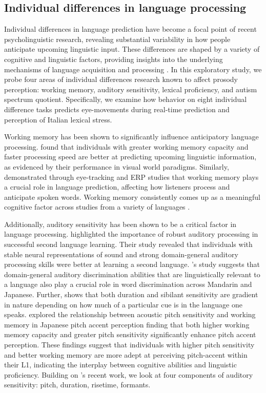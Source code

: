 \subsection{Individual differences in language processing}

Individual differences in language prediction have become a focal point of recent psycholinguistic research, revealing substantial variability in how people anticipate upcoming linguistic input. These differences are shaped by a variety of cognitive and linguistic factors, providing insights into the underlying mechanisms of language acquisition and processing \citep{Huettig2016,Li2023,Kidd2018}. In this exploratory study, we probe four areas of individual differences research known to affect prosody perception: working memory, auditory sensitivity, lexical proficiency, and autism spectrum quotient. Specifically, we examine how behavior on eight individual difference tasks predicts eye-movements during real-time prediction and perception of Italian lexical stress.

Working memory has been shown to significantly influence anticipatory language processing. \cite{Huettig2016} found that individuals with greater working memory capacity and faster processing speed are better at predicting upcoming linguistic information, as evidenced by their performance in visual world paradigms. Similarly, \cite{Li2023} demonstrated through eye-tracking and ERP studies that working memory plays a crucial role in language prediction, affecting how listeners process and anticipate spoken words. Working memory consistently comes up as a meaningful cognitive factor across studies from a variety of languages \citep{mchaney_et_al_2021_workingmemory,goss_2014,hadar_2016}. 

Additionally, auditory sensitivity has been shown to be a critical factor in language processing. \cite{Kachlicka_Saito_Tierney_2019} highlighted the importance of robust auditory processing in successful second language learning. Their study revealed that individuals with stable neural representations of sound and strong domain-general auditory processing skills were better at learning a second language. \cite{bramlett_wiener_24_speechprosody}'s study suggests that domain-general auditory discrimination abilities that are linguistically relevant to a language also play a crucial role in word discrimination across Mandarin and Japanese. Further, \cite{Pajak_2014} shows that both duration and sibilant sensitivity are gradient in nature depending on how much of a particular cue is in the language one speaks. \cite{goss_2014} explored the relationship between acoustic pitch sensitivity and working memory in Japanese pitch accent perception finding that both higher working memory capacity and greater pitch sensitivity significantly enhance pitch accent perception. These findings suggest that individuals with higher pitch sensitivity and better working memory are more adept at perceiving pitch-accent within their L1, indicating the interplay between cognitive abilities and linguistic proficiency.
Building on \cite{Kachlicka_Saito_Tierney_2019}'s recent work, we look at four components of auditory sensitivity: pitch, duration, risetime, formants.  


